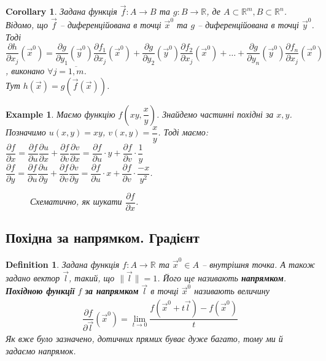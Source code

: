 \documentclass[a4paper, 10pt]{article}
\def\departial#1#2{\dfrac{\partial {#1}}{\partial {#2}}}
\theoremstyle{theoremdd}
\theoremstyle{theoremdd}
\theoremstyle{theoremdd}
\newtheorem{definition}[theorem]{Definition}
\theoremstyle{theoremdd}
\theoremstyle{theoremdd}
\newtheorem{example}[theorem]{Example}
\theoremstyle{theoremdd}
\theoremstyle{theoremdd}
\theoremstyle{theoremdd}
\theoremstyle{theoremdd}
\newtheorem{corollary}[theorem]{Corollary}
\newcommand\Norm[1]{\|#1\|}
\begin{document}
\begin{corollary}
Задана функція $\vec{f}\colon A \to B$ та $g\colon B \to \mathbb{R}$, де $A \subset \mathbb{R}^m, B \subset \mathbb{R}^n$. Відомо, що $\vec{f}$ -- диференційована в точці $\vec{x}^0$ та $g$ -- диференційована в точці $\vec{y}^0$.\\
Тоді $\departial{h}{x_j}(\vec{x}^0) = \departial{g}{y_1}(\vec{y}^0) \departial{f_1}{x_j}(\vec{x}^0) + \departial{g}{y_2}(\vec{y}^0) \departial{f_2}{x_j}(\vec{x}^0) + \dots + \departial{g}{y_n}(\vec{y}^0) \departial{f_n}{x_j}(\vec{x}^0)$, виконано $\forall j = \overline{1,m}$.\\
Тут $h(\vec{x}) = g(\vec{f}(\vec{x}))$.
\end{corollary}

\begin{example}
Маємо функцію $f\left( xy, \dfrac{x}{y} \right)$. Знайдемо частинні похідні за $x,y$.\\
Позначимо $u(x,y) = xy$, $v(x,y) = \dfrac{x}{y}$. Тоді маємо:\\
$\departial{f}{x} = \departial{f}{u} \departial{u}{x} + \departial{f}{v} \departial{v}{x} = \departial{f}{u} \cdot y + \departial{f}{v} \cdot \dfrac{1}{y}$\\
$\departial{f}{y} = \departial{f}{u} \departial{u}{y} + \departial{f}{v} \departial{v}{y} = \departial{f}{u} \cdot x + \departial{f}{v} \cdot \dfrac{-x}{y^2}$.
\begin{figure}[H]
\centering
{}
\caption*{Схематично, як шукати $\departial{f}{x}$.}
\end{figure}
\end{example}

\subsection{Похідна за напрямком. Градієнт}
\begin{definition}
Задана функція $f\colon A \to \mathbb{R}$ та $\vec{x}^0 \in A$ -- внутрішня точка. А також задано вектор $\vec{l}$, такий, що $\Norm{\vec{l}} = 1$. Його ще називають \textbf{напрямком}.\\
\textbf{Похідною функції} $f$ \textbf{за напрямком} $\vec{l}$ в точці $\vec{x}^0$ називають величину
\begin{align*}
\dfrac{\partial f}{\partial \vec{l}} (\vec{x}^0) = \lim_{t \to 0} \dfrac{f(\vec{x}^0+t \vec{l}) - f(\vec{x}^0)}{t}
\end{align*}
Як вже було зазначено, дотичних прямих буває дуже багато, тому ми й задаємо напрямок.
\end{definition}
\end{document}

